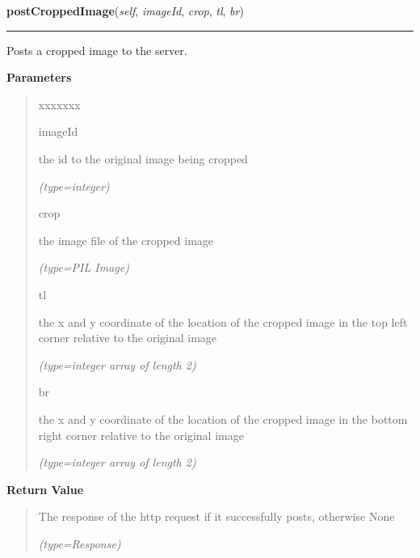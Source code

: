\hspace{.8\funcindent}\begin{boxedminipage}{\funcwidth}

    \raggedright \textbf{postCroppedImage}(\textit{self}, \textit{imageId}, \textit{crop}, \textit{tl}, \textit{br})

    \vspace{-1.5ex}

    \rule{\textwidth}{0.5\fboxrule}
\setlength{\parskip}{2ex}
    Posts a cropped image to the server.

\setlength{\parskip}{1ex}
      \textbf{Parameters}
      \vspace{-1ex}

      \begin{quote}
        \begin{Ventry}{xxxxxxx}

          \item[imageId]

          the id to the original image being cropped

            {\it (type=integer)}

          \item[crop]

          the image file of the cropped image

            {\it (type=PIL Image)}

          \item[tl]

          the x and y coordinate of the location of the cropped image in 
          the top left corner relative to the original image

            {\it (type=integer array of length 2)}

          \item[br]

          the x and y coordinate of the location of the cropped image in 
          the bottom right corner relative to the original image

            {\it (type=integer array of length 2)}

        \end{Ventry}

      \end{quote}

      \textbf{Return Value}
    \vspace{-1ex}

      \begin{quote}
      The response of the http request if it successfully posts, otherwise 
      None

      {\it (type=Response)}

      \end{quote}

    \end{boxedminipage}

